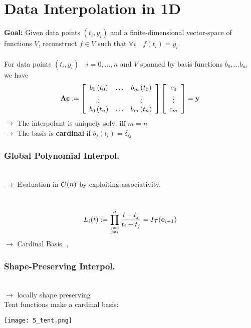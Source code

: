 \columnbreak
\part{Data Interpolation in 1D}
\setcounter{section}{0}

\textbf{Goal:} Given data points $(t_i, y_i)$ and a finite-dimensional vector-space of functions $V$, reconstruct $f\in V$ such that $\forall i \quad f(t_i)=y_i$. \\

 \\
For data points $(t_i, y_i) \quad i=0,\dots,n$
and $V$ spanned by basis functions $b_0,\dots b_m$ we have
$$
\mathbf{A} \mathbf{c}:=\left[\begin{array}{ccc}
b_{0}\left(t_{0}\right) & \ldots & b_{m}\left(t_{0}\right) \\
\vdots & & \vdots \\
b_{0}\left(t_{n}\right) & \ldots & b_{m}\left(t_{n}\right)
\end{array}\right]\left[\begin{array}{c}
c_{0} \\
\vdots \\
c_{m}
\end{array}\right]=\mathbf{y}
$$
$\rightarrow$ The interpolant is uniquely solv. iff $m=n$\\
$\rightarrow$ The basis is \textbf{cardinal} if $b_{j}\left(t_{i}\right)=\delta_{i j}$

\section{Global Polynomial Interpol.}

\\
$\rightarrow$ Evaluation in $\mathcal{O}(n)$ by exploiting associativity.

\\
$$L_{i}(t):=\prod_{j=0 \atop j \neq i}^{n} \frac{t-t_{j}}{t_{i}-t_{j}} = I_\mathcal{T}(\mathbf{e}_{i+1})$$
$\rightarrow$ Cardinal Basis.
\sep

\section{Shape-Preserving Interpol.}

 \\
$\rightarrow$ locally shape preserving \\
Tent functions make a cardinal basis:
\begin{center}
\texttt{[image: 5\_tent.png]}
\end{center}

